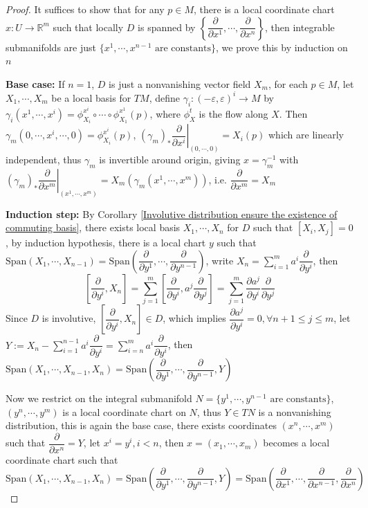 \documentclass[../main.tex]{subfiles}
\begin{document}
\begin{proof}
It suffices to show that for any $p\in M$, there is a local coordinate chart $x:U\to\mathbb R^m$ such that locally $D$ is spanned by $\left\{\dfrac{\partial}{\partial x^1},\cdots,\dfrac{\partial}{\partial x^n}\right\}$, then integrable submanifolds are just $\{x^1,\cdots,x^{n-1}\text{ are constants}\}$, we prove this by induction on $n$ \par
\textbf{Base case: }If $n=1$, $D$ is just a nonvanishing vector field $X_m$, for each $p\in M$, let $X_1,\cdots,X_m$ be a local basis for $TM$, define $\gamma_i:(-\varepsilon,\varepsilon)^i\to M$ by $\gamma_i(x^1,\cdots,x^i)=\phi^{x^{i}}_{X_{i}}\circ\cdots\circ\phi^{x^{1}}_{X_{1}}(p)$, where $\phi^t_X$ is the flow along $X$. Then $\gamma_m(0,\cdots,x^i,\cdots,0)=\phi^{x^i}_{X_i}(p)$, $(\gamma_{m})_*\left.\dfrac{\partial}{\partial x^i}\right|_{(0,\cdots,0)}=X_i(p)$ which are linearly independent, thus $\gamma_m$ is invertible around origin, giving $x=\gamma_m^{-1}$ with $(\gamma_{m})_*\left.\dfrac{\partial}{\partial x^m}\right|_{(x^1,\cdots,x^m)}=X_m(\gamma_m(x^1,\cdots,x^m))$, i.e. $\dfrac{\partial}{\partial x^m}=X_m$ \par
\textbf{Induction step: }
By Corollary \ref{Involutive distribution ensure the existence of commuting basis}, there exists local basis $X_1,\cdots,X_n$ for $D$ such that $[X_i,X_j]=0$, by induction hypothesis, there is a local chart $y$ such that $\mathrm{Span}\left(X_1,\cdots,X_{n-1}\right)=\mathrm{Span}\left(\dfrac{\partial}{\partial y^1},\cdots,\dfrac{\partial}{\partial y^{n-1}}\right)$, write $\displaystyle X_n=\sum_{i=1}^ma^i\dfrac{\partial}{\partial y^i}$, then
\[\displaystyle\left[\dfrac{\partial}{\partial y^i},X_n\right]=\sum_{j=1}^m\left[\dfrac{\partial}{\partial y^i},a^j\dfrac{\partial}{\partial y^j}\right]=\sum_{j=1}^m\dfrac{\partial a^j}{\partial y^i}\dfrac{\partial}{\partial y^j}\]
Since $D$ is involutive, $\left[\dfrac{\partial}{\partial y^i},X_n\right]\in D$, which implies $\dfrac{\partial a^j}{\partial y^i}=0,\forall n+1\leq j\leq m$, let $\displaystyle Y:=X_n-\sum_{i=1}^{n-1}a^i\dfrac{\partial}{\partial y^i}=\sum_{i=n}^{m}a^i\dfrac{\partial}{\partial y^i}$, then $\mathrm{Span}\left(X_1,\cdots,X_{n-1},X_n\right)=\mathrm{Span}\left(\dfrac{\partial}{\partial y^1},\cdots,\dfrac{\partial}{\partial y^{n-1}},Y\right)$ \par
Now we restrict on the integral submanifold $N=\{y^1,\cdots,y^{n-1}\text{ are constants}\}$, $(y^n,\cdots,y^m)$ is a local coordinate chart on $N$, thus $Y\in TN$ is a nonvanishing distribution, this is again the base case, there exists coordinates $(x^n,\cdots,x^m)$ such that $\dfrac{\partial}{\partial x^n}=Y$, let $x^i=y^i,i<n$, then $x=(x_1,\cdots,x_m)$ becomes a local coordinate chart such that $\mathrm{Span}\left(X_1,\cdots,X_{n-1},X_n\right)=\mathrm{Span}\left(\dfrac{\partial}{\partial y^1},\cdots,\dfrac{\partial}{\partial y^{n-1}},Y\right)=\mathrm{Span}\left(\dfrac{\partial}{\partial x^1},\cdots,\dfrac{\partial}{\partial x^{n-1}},\dfrac{\partial}{\partial x^n}\right)$
\end{proof}
\end{document}
